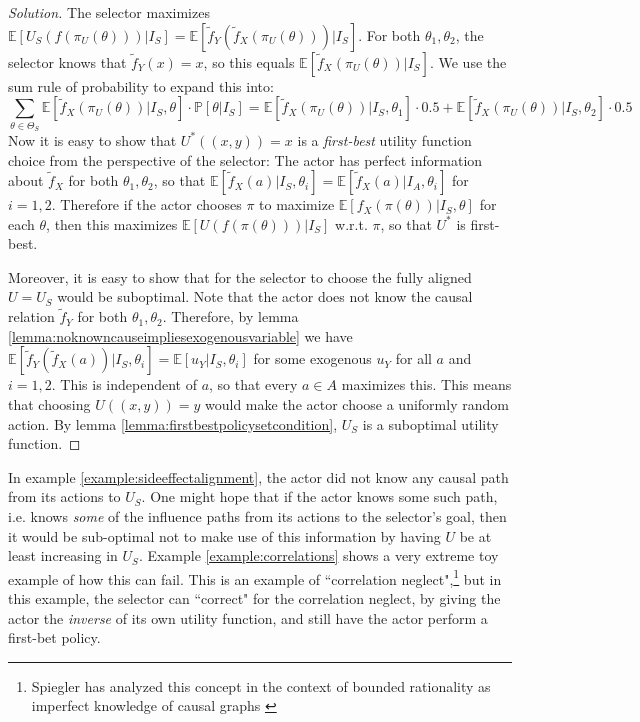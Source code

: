  
 
 
 \begin{proof}[Solution]
	The selector maximizes $\mathbb E[U_S(f(\pi_U(\theta)))|I_S]=\mathbb E[\tilde f_Y(\tilde f_X(\pi_U(\theta)))|I_S]$. For both $\theta_1,\theta_2$, the selector knows that $\tilde f_Y(x)=x$, so this equals $\mathbb E[\tilde f_X(\pi_U(\theta))|I_S]$. We use the sum rule of probability to expand this into:
	\[\sum_{\theta\in \Theta_S}\mathbb E[\tilde f_X(\pi_U(\theta))|I_S,\theta] \cdot \mathbb  P[\theta|I_S]=\mathbb E[\tilde f_X(\pi_U(\theta))|I_S,\theta_1]\cdot 0.5 +\mathbb E[\tilde f_X(\pi_U(\theta))|I_S,\theta_2]\cdot 0.5\]
	Now it is easy to show that $U^*((x,y))=x$ is a \textit{first-best} utility function choice from the perspective of the selector: The actor has perfect information about $\tilde f_X$ for both $\theta_1,\theta_2$, so that $\mathbb E[\tilde f_X(a)|I_S,\theta_i]=\mathbb E[\tilde f_X(a)|I_A,\theta_i]$ for $i=1,2$. Therefore if the actor chooses $\pi$ to maximize $\mathbb E[f_X(\pi(\theta))|I_S,\theta]$ for each $\theta$, then this maximizes $\mathbb E[U(f(\pi(\theta)))|I_S]$ w.r.t. $\pi$, so that $U^*$ is first-best.
	
	Moreover, it is easy to show that for the selector to choose the fully aligned $U=U_S$ would be suboptimal. Note that the actor does not know the causal relation $\tilde f_Y$ for both $\theta_1,\theta_2$. Therefore, by lemma \ref{lemma:noknowncauseimpliesexogenousvariable} we have $\mathbb E[\tilde f_Y(\tilde f_X(a))|I_S,\theta_i]=\mathbb E[u_Y|I_S,\theta_i]$ for some exogenous $u_Y$ for all $a$ and $i=1,2$. This is independent of $a$, so that every $a\in A$ maximizes this. This means that choosing $U((x,y))=y$ would make the actor choose a uniformly random action. By lemma \ref{lemma:firstbestpolicysetcondition}, $U_S$ is a suboptimal utility function.
 \end{proof} 
 
 
 
 
 \bigskip
 
\noindent In example \ref{example:sideeffectalignment}, the actor did not know any causal path from its actions to $U_S$. One might hope that if the actor knows some such path, i.e. knows \textit{some} of the influence paths from its actions to the selector's goal, then it would be sub-optimal not to make use of this information by having $U$ be at least increasing in $U_S$. Example \ref{example:correlations} shows a very extreme toy example of how this can fail. This is an example of ``correlation neglect",\footnote{Spiegler has analyzed this concept in the context of bounded rationality as imperfect knowledge of causal graphs \citep{Spiegler2016} } but in this example, the selector can ``correct" for the correlation neglect, by giving the actor the \textit{inverse} of its own utility function, and still have the actor perform a first-bet policy. 
 

